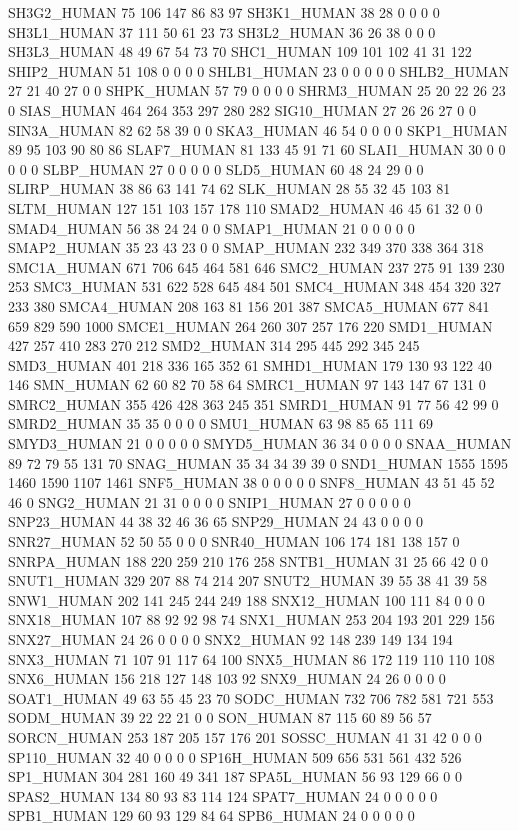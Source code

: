 SH3G2_HUMAN	75	106	147	86	83	97
SH3K1_HUMAN	38	28	0	0	0	0
SH3L1_HUMAN	37	111	50	61	23	73
SH3L2_HUMAN	36	26	38	0	0	0
SH3L3_HUMAN	48	49	67	54	73	70
SHC1_HUMAN	109	101	102	41	31	122
SHIP2_HUMAN	51	108	0	0	0	0
SHLB1_HUMAN	23	0	0	0	0	0
SHLB2_HUMAN	27	21	40	27	0	0
SHPK_HUMAN	57	79	0	0	0	0
SHRM3_HUMAN	25	20	22	26	23	0
SIAS_HUMAN	464	264	353	297	280	282
SIG10_HUMAN	27	26	26	27	0	0
SIN3A_HUMAN	82	62	58	39	0	0
SKA3_HUMAN	46	54	0	0	0	0
SKP1_HUMAN	89	95	103	90	80	86
SLAF7_HUMAN	81	133	45	91	71	60
SLAI1_HUMAN	30	0	0	0	0	0
SLBP_HUMAN	27	0	0	0	0	0
SLD5_HUMAN	60	48	24	29	0	0
SLIRP_HUMAN	38	86	63	141	74	62
SLK_HUMAN	28	55	32	45	103	81
SLTM_HUMAN	127	151	103	157	178	110
SMAD2_HUMAN	46	45	61	32	0	0
SMAD4_HUMAN	56	38	24	24	0	0
SMAP1_HUMAN	21	0	0	0	0	0
SMAP2_HUMAN	35	23	43	23	0	0
SMAP_HUMAN	232	349	370	338	364	318
SMC1A_HUMAN	671	706	645	464	581	646
SMC2_HUMAN	237	275	91	139	230	253
SMC3_HUMAN	531	622	528	645	484	501
SMC4_HUMAN	348	454	320	327	233	380
SMCA4_HUMAN	208	163	81	156	201	387
SMCA5_HUMAN	677	841	659	829	590	1000
SMCE1_HUMAN	264	260	307	257	176	220
SMD1_HUMAN	427	257	410	283	270	212
SMD2_HUMAN	314	295	445	292	345	245
SMD3_HUMAN	401	218	336	165	352	61
SMHD1_HUMAN	179	130	93	122	40	146
SMN_HUMAN	62	60	82	70	58	64
SMRC1_HUMAN	97	143	147	67	131	0
SMRC2_HUMAN	355	426	428	363	245	351
SMRD1_HUMAN	91	77	56	42	99	0
SMRD2_HUMAN	35	35	0	0	0	0
SMU1_HUMAN	63	98	85	65	111	69
SMYD3_HUMAN	21	0	0	0	0	0
SMYD5_HUMAN	36	34	0	0	0	0
SNAA_HUMAN	89	72	79	55	131	70
SNAG_HUMAN	35	34	34	39	39	0
SND1_HUMAN	1555	1595	1460	1590	1107	1461
SNF5_HUMAN	38	0	0	0	0	0
SNF8_HUMAN	43	51	45	52	46	0
SNG2_HUMAN	21	31	0	0	0	0
SNIP1_HUMAN	27	0	0	0	0	0
SNP23_HUMAN	44	38	32	46	36	65
SNP29_HUMAN	24	43	0	0	0	0
SNR27_HUMAN	52	50	55	0	0	0
SNR40_HUMAN	106	174	181	138	157	0
SNRPA_HUMAN	188	220	259	210	176	258
SNTB1_HUMAN	31	25	66	42	0	0
SNUT1_HUMAN	329	207	88	74	214	207
SNUT2_HUMAN	39	55	38	41	39	58
SNW1_HUMAN	202	141	245	244	249	188
SNX12_HUMAN	100	111	84	0	0	0
SNX18_HUMAN	107	88	92	92	98	74
SNX1_HUMAN	253	204	193	201	229	156
SNX27_HUMAN	24	26	0	0	0	0
SNX2_HUMAN	92	148	239	149	134	194
SNX3_HUMAN	71	107	91	117	64	100
SNX5_HUMAN	86	172	119	110	110	108
SNX6_HUMAN	156	218	127	148	103	92
SNX9_HUMAN	24	26	0	0	0	0
SOAT1_HUMAN	49	63	55	45	23	70
SODC_HUMAN	732	706	782	581	721	553
SODM_HUMAN	39	22	22	21	0	0
SON_HUMAN	87	115	60	89	56	57
SORCN_HUMAN	253	187	205	157	176	201
SOSSC_HUMAN	41	31	42	0	0	0
SP110_HUMAN	32	40	0	0	0	0
SP16H_HUMAN	509	656	531	561	432	526
SP1_HUMAN	304	281	160	49	341	187
SPA5L_HUMAN	56	93	129	66	0	0
SPAS2_HUMAN	134	80	93	83	114	124
SPAT7_HUMAN	24	0	0	0	0	0
SPB1_HUMAN	129	60	93	129	84	64
SPB6_HUMAN	24	0	0	0	0	0
